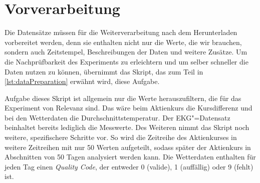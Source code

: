 \section{Vorverarbeitung}
Die Datensätze müssen für die Weiterverarbeitung nach dem Herunterladen vorbereitet werden, denn sie enthalten nicht nur die Werte, die wir brauchen, sondern auch Zeitstempel, Beschreibungen der Daten und weitere Zusätze. Um die Nachprüfbarkeit des Experiments zu erleichtern und um selber schneller die Daten nutzen zu können, übernimmt das Skript, das zum Teil in \autoref{lst:dataPreparation} erwähnt wird, diese Aufgabe.

Aufgabe dieses Skript ist allgemein nur die Werte herauszufiltern, die für das Experiment von Relevanz sind. Das wäre beim Aktienkurs die Kursdifferenz und bei den Wetterdaten die Durchschnittstemperatur. Der EKG"=Datensatz beinhaltet bereits lediglich die Messwerte. Des Weiteren nimmt das Skript noch weitere, spezifischere Schritte vor. So wird die Zeitreihe des Aktienkurses in weitere Zeitreihen mit nur 50 Werten aufgeteilt, sodass später der Aktienkurs in Abschnitten von 50 Tagen analysiert werden kann. Die Wetterdaten enthalten für jeden Tag einen \textit{Quality Code}, der entweder 0 (valide), 1 (auffällig) oder 9 (fehlt) ist.